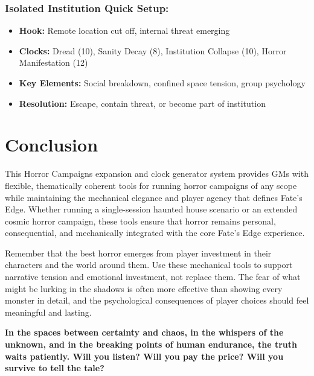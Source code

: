 \documentclass[11pt]{article}
\begin{document}
\subsubsection{Isolated Institution Quick Setup:}
\begin{itemize}
\item \textbf{Hook:} Remote location cut off, internal threat emerging
\item \textbf{Clocks:} Dread (10), Sanity Decay (8), Institution Collapse (10), Horror Manifestation (12)
\item \textbf{Key Elements:} Social breakdown, confined space tension, group psychology
\item \textbf{Resolution:} Escape, contain threat, or become part of institution
\end{itemize}

\section{Conclusion}

This Horror Campaigns expansion and clock generator system provides GMs with flexible, thematically coherent tools for running horror campaigns of any scope while maintaining the mechanical elegance and player agency that defines Fate's Edge. Whether running a single-session haunted house scenario or an extended cosmic horror campaign, these tools ensure that horror remains personal, consequential, and mechanically integrated with the core Fate's Edge experience.

Remember that the best horror emerges from player investment in their characters and the world around them. Use these mechanical tools to support narrative tension and emotional investment, not replace them. The fear of what might be lurking in the shadows is often more effective than showing every monster in detail, and the psychological consequences of player choices should feel meaningful and lasting.

\begin{center}
\textbf{In the spaces between certainty and chaos, in the whispers of the unknown, and in the breaking points of human endurance, the truth waits patiently. Will you listen? Will you pay the price? Will you survive to tell the tale?}
\end{center}
\end{document}
